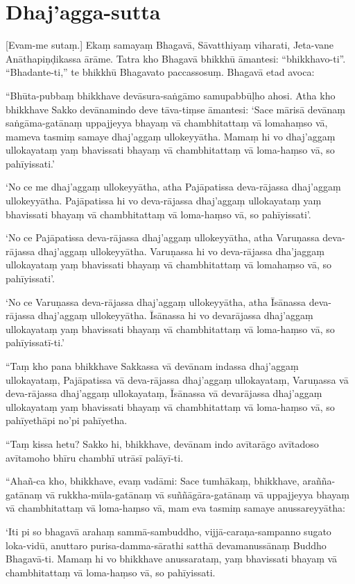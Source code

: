 \section{Dhaj'agga-sutta}

\ifhandbookedition
\enlargethispage{\baselineskip}
\fi

[Evam-me sutaṃ.] Ekaṃ samayaṃ Bhagavā, Sāvatthiyaṃ viharati, Jeta-vane
Anāthapiṇḍikassa ārāme. Tatra kho Bhagavā bhikkhū āmantesi: “bhikkhavo-ti”.
“Bhadante-ti,” te bhikkhū Bhagavato paccassosuṃ. Bhagavā etad avoca:

“Bhūta-pubbaṃ bhikkhave devāsura-saṅgāmo samupabbūḷho ahosi. Atha kho bhikkhave
Sakko devānamindo deve tāva-tiṃse āmantesi: ‘Sace mārisā devānaṃ saṅgāma-gatānaṃ
uppajjeyya bhayaṃ vā chambhitattaṃ vā lomahaṃso vā, mameva tasmiṃ samaye
dhaj’aggaṃ ullokeyyātha. Mamaṃ hi vo dhaj’aggaṃ ullokayataṃ yaṃ bhavissati
bhayaṃ vā chambhitattaṃ vā loma-haṃso vā, so pahīyissati.’

‘No ce me dhaj’aggaṃ ullokeyyātha, atha Pajāpatissa deva-rājassa dhaj’aggaṃ
ullokeyyātha. Pajāpatissa hi vo deva-rājassa dhaj’aggaṃ ullokayataṃ yaṃ
bhavissati bhayaṃ vā chambhitattaṃ vā loma-haṃso vā, so pahīyissati’.

‘No ce Pajāpatissa deva-rājassa dhaj’aggaṃ ullokeyyātha, atha Varuṇassa
deva-rājassa dhaj’aggaṃ ullokeyyātha. Varuṇassa hi vo deva-rājassa dha’jaggaṃ
ullokayataṃ yaṃ bhavissati bhayaṃ vā chambhitattaṃ vā lomahaṃso vā, so
pahīyissati’.

‘No ce Varuṇassa deva-rājassa dhaj’aggaṃ ullokeyyātha, atha Īsānassa
deva-rājassa dhaj’aggaṃ ullokeyyātha. Īsānassa hi vo devarājassa dhaj’aggaṃ
ullokayataṃ yaṃ bhavissati bhayaṃ vā chambhitattaṃ vā loma-haṃso vā, so
pahīyissatī-ti.’

“Taṃ kho pana bhikkhave Sakkassa vā devānam indassa dhaj’aggaṃ ullokayataṃ,
Pajāpatissa vā deva-rājassa dhaj’aggaṃ ullokayataṃ, Varuṇassa vā deva-rājassa
dhaj’aggaṃ ullokayataṃ, Īsānassa vā devarājassa dhaj’aggaṃ ullokayataṃ yaṃ
bhavissati bhayaṃ vā chambhitattaṃ vā loma-haṃso vā, so pahīyethāpi no’pi
pahīyetha.

“Taṃ kissa hetu? Sakko hi, bhikkhave, devānam indo avītarāgo avītadoso avītamoho
bhīru chambhī utrāsī palāyī-ti.

“Ahañ-ca kho, bhikkhave, evaṃ vadāmi: Sace tumhākaṃ, bhikkhave, arañña-gatānaṃ
vā rukkha-mūla-gatānaṃ vā suññāgāra-gatānaṃ vā uppajjeyya bhayaṃ vā
chambhitattaṃ vā loma-haṃso vā, mam eva tasmiṃ samaye anussareyyātha:

‘Iti pi so bhagavā arahaṃ sammā-sambuddho, vijjā-caraṇa-sampanno sugato
loka-vidū, anuttaro purisa-damma-sārathi satthā devamanussānaṃ Buddho
Bhagavā-ti. Mamaṃ hi vo bhikkhave anussarataṃ, yaṃ bhavissati bhayaṃ vā
chambhitattaṃ vā loma-haṃso vā, so pahīyissati.

